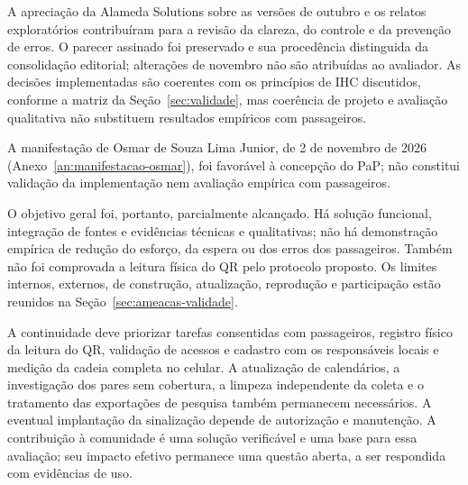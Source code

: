 \documentclass[12pt,oneside,a4paper,brazil,chapter=TITLE]{abntex2}
\begin{document}
A apreciação da Alameda Solutions sobre as versões de outubro e os relatos exploratórios contribuíram para a revisão da clareza, do controle e da prevenção de erros. O parecer assinado foi preservado e sua procedência distinguida da consolidação editorial; alterações de novembro não são atribuídas ao avaliador. As decisões implementadas são coerentes com os princípios de IHC discutidos, conforme a matriz da Seção~\ref{sec:validade}, mas coerência de projeto e avaliação qualitativa não substituem resultados empíricos com passageiros.

A manifestação de Osmar de Souza Lima Junior, de 2 de novembro de 2026 (Anexo~\ref{an:manifestacao-osmar}), foi favorável à concepção do PaP; não constitui validação da implementação nem avaliação empírica com passageiros.

O objetivo geral foi, portanto, parcialmente alcançado. Há solução funcional, integração de fontes e evidências técnicas e qualitativas; não há demonstração empírica de redução do esforço, da espera ou dos erros dos passageiros. Também não foi comprovada a leitura física do QR pelo protocolo proposto. Os limites internos, externos, de construção, atualização, reprodução e participação estão reunidos na Seção~\ref{sec:ameacas-validade}.

A continuidade deve priorizar tarefas consentidas com passageiros, registro físico da leitura do QR, validação de acessos e cadastro com os responsáveis locais e medição da cadeia completa no celular. A atualização de calendários, a investigação dos pares sem cobertura, a limpeza independente da coleta e o tratamento das exportações de pesquisa também permanecem necessários. A eventual implantação da sinalização depende de autorização e manutenção. A contribuição à comunidade é uma solução verificável e uma base para essa avaliação; seu impacto efetivo permanece uma questão aberta, a ser respondida com evidências de uso.
\end{document}
